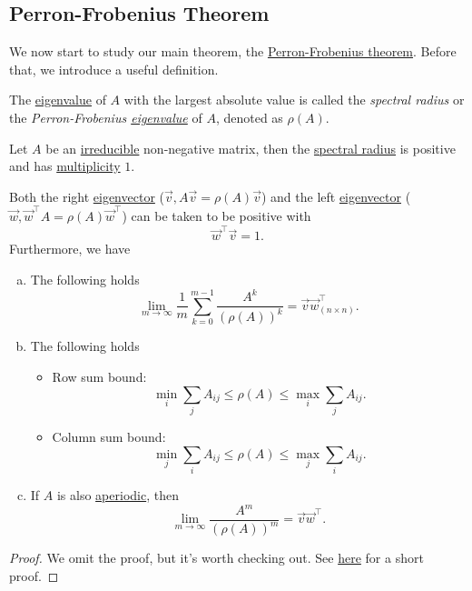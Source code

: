 \subsection{Perron-Frobenius Theorem}
We now start to study our main theorem, the \hyperref[thm:Perron-Frobenius-theorem]{Perron-Frobenius theorem}. Before that, we introduce a useful definition.

\begin{definition}\label{def:spectral-radius}
	The \hyperref[def:eigenvalue]{eigenvalue} of \(A\) with the largest absolute value is called the \emph{spectral radius} or the \emph{Perron-Frobenius \hyperref[def:eigenvalue]{eigenvalue}} of \(A\), denoted as \(\rho(A)\).
\end{definition}

\begin{theorem}\label{thm:Perron-Frobenius-theorem}
	Let \(A\) be an \hyperref[def:irreducible]{irreducible} non-negative matrix, then the \hyperref[def:spectral-radius]{spectral radius} is positive
	and has \hyperref[def:multiplicity]{multiplicity} \(1\).

	Both the right \hyperref[def:eigenvector]{eigenvector} (\(\vec{v}, A \vec{v} = \rho(A) \vec{v}\)) and the left \hyperref[def:eigenvector]{eigenvector} (\(\vec{w}, \vec{w}^{\top}A = \rho(A) \vec{w}^{\top}\))
	can be taken to be positive with
	\[
		\vec{w}^{\top} \vec{v} = 1.
	\]
	Furthermore, we have
	\begin{enumerate}[(a)]
		\item The following holds
		      \[
			      \lim_{m \to \infty} \frac{1}{m} \sum\limits_{k=0}^{m-1} \frac{A^k}{(\rho(A))^k} = \vec{v} \vec{w}^{\top}_{(n\times n)}.
		      \]
		\item The following holds
		      \begin{itemize}
			      \item Row sum bound:
			            \[
				            \min_i \sum\limits_{j} A_{ij} \leq \rho(A) \leq \max_i \sum\limits_{j} A_{ij}.
			            \]
			      \item Column sum bound:
			            \[
				            \min_j \sum\limits_{i} A_{ij} \leq \rho(A) \leq \max_j \sum\limits_{i} A_{ij}.
			            \]
		      \end{itemize}
		\item If \(A\) is also \hyperref[def:aperiodic]{aperiodic}, then
		      \[
			      \lim_{m \to \infty} \frac{A^m}{(\rho(A))^m} = \vec{v} \vec{w}^{\top}.
		      \]
	\end{enumerate}
\end{theorem}
\begin{proof}
	We omit the proof, but it's worth checking out. See \href{https://pi.math.cornell.edu/~web6720/Perron-Frobenius_Hannah%20Cairns.pdf}{here} for a short proof.
\end{proof}

